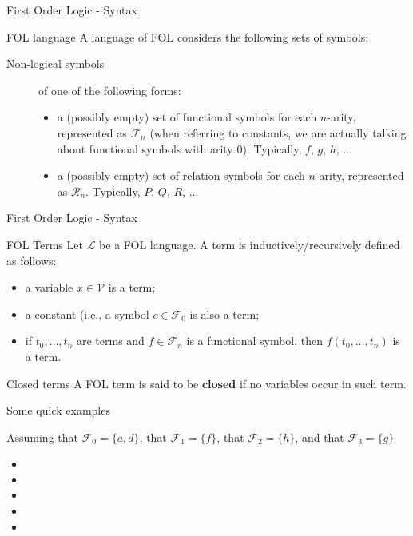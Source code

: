 \documentclass[aspectratio=169]{beamer}
\begin{document}
\begin{slide}{First Order Logic - Syntax}  

  \begin{block}{FOL language}  
    A language of FOL considers the following sets of symbols:
    \begin{description}
    \item [Non-logical symbols] of one of the following forms:
      \begin{itemize}
      \item a (possibly empty) set of functional symbols for each $n$-arity, represented as $\mathcal{F}_n$ (when referring to constants, we are actually talking about functional symbols with arity $0$). Typically, $f$, $g$, $h$, $\ldots$
      \item a (possibly empty) set of relation symbols for each $n$-arity, represented as $\mathcal{R}_n$. Typically, $P$, $Q$, $R$, $\ldots$
      \end{itemize}
    \end{description}
  \end{block}
  



\end{slide}

\begin{slide}{First Order Logic - Syntax}
  \begin{block}{FOL Terms}  
  Let $\mathcal{L}$ be a FOL language. A term is inductively/recursively defined as follows:
  \begin{itemize}
  \item a variable $x \in \mathcal{V}$ is a term;
  \item a constant (i.e., a symbol $c \in \mathcal{F}_0$ is also a term;
  \item if $t_0,\ldots,t_n$ are terms and $f \in \mathcal{F}_n$ is a functional symbol, then $f(t_0,\ldots,t_n)$ is a term.  
  \end{itemize}
  \end{block}
  
  \begin{block}{Closed terms}
    A FOL term is said to be {\bf closed} if no variables occur in such term.
  \end{block}

\end{slide}

\begin{slide}{Some quick examples}

Assuming that $\mathcal{F}_0 = \{a,d\}$, that $\mathcal{F}_1 = \{f\}$, that $\mathcal{F}_2 = \{h\}$, and that $\mathcal{F}_3 = \{g\}$

\begin{itemize}
\item {}
\item {}
\item {}
\item {}
\item {}
\end{itemize}

\end{slide}
\end{document}
